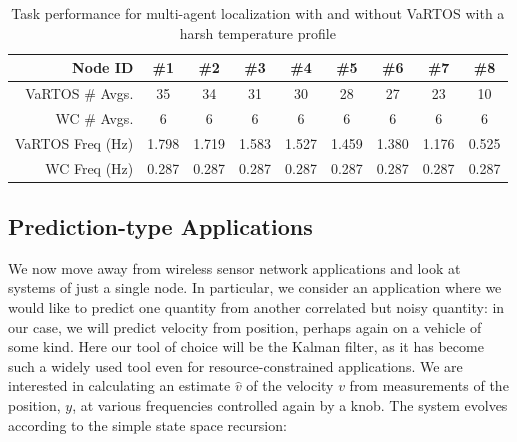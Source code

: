 \begin{table}
\caption{\label{tab:loc_knobs}Task performance for multi-agent localization with and without VaRTOS with a harsh temperature profile}
\centering
\begin{tabular}{r|cccccccc}
\hline
Node ID & \#1 & \#2 & \#3 & \#4 & \#5 & \#6 & \#7 & \#8 \\ \hline
VaRTOS \# Avgs. & 35 & 34 & 31 & 30 & 28 & 27 & 23 & 10 \\
WC \# Avgs. & 6 & 6 & 6 & 6 & 6 & 6 & 6 & 6 \\
VaRTOS Freq (Hz) & 1.798  & 1.719 & 1.583 &1.527 & 1.459 & 1.380 & 1.176  & 0.525 \\
WC Freq (Hz) & 0.287 & 0.287 & 0.287 & 0.287 & 0.287 & 0.287 & 0.287 & 0.287 \\ \hline
\end{tabular}
\end{table}


%
%

%
%



\subsection{Prediction-type Applications}
We now move away from wireless sensor network applications and look at systems of just a single node.  In particular, we consider an application where we would like to predict one quantity from another correlated but noisy quantity: in our case, we will predict velocity from position, perhaps again on a vehicle of some kind.  Here our tool of choice will be the Kalman filter, as it has become such a widely used tool even for resource-constrained applications. We are interested in calculating an estimate $\hat{v}$ of the velocity $v$ from measurements of the position, $y$, at various frequencies controlled again by a knob.  The system evolves according to the simple state space recursion: 

